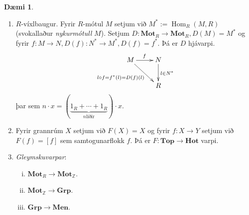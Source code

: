 \documentclass[a4paper,icelandic]{book}
\theoremstyle{definition}
\newtheorem{daemi}{Dæmi}[section]
\theoremstyle{plain}
\theoremstyle{remark}
\newcommand{\Z}{\mathbb{Z}} %
\DeclareMathOperator{\Hom}{Hom}
\begin{document}
\begin{daemi}
  \begin{enumerate}[(1)]
    \item  $R$-víxlbaugur. Fyrir $R$-mótul $M$ setjum við $M^* :=
      \Hom_R(M,R)$ (svokallaður \emph{nykurmótull}
      $M$). Setjum $D:\mathbf{Mot}_R\to\mathbf{Mot}_R, D(M) = M^*$ og
      fyrir $f:M\to N, D(f): N^*\to M^*, D(f) = f^*$. Þá er $D$
      hjávarpi.  
      \[ \xymatrix{ 
      M \ar[r]^f\ar[dr]_{l\circ f = f^*(l) = D(f)(l)}
      & N \ar[d]^{l\in N^*} \\ 
      & R
      }
      \] 
      þar sem $n \cdot x =
      (\underbrace{1_R+\cdots+1_R}_{n\text{liðir}})\cdot x$.
    \item Fyrir grannrúm $X$ setjum við $F(X) = X$ og fyrir $f:X\to Y$
      setjum við $F(f) = [f]$ sem samtogunarflokk $f$. Þá er
      $F:\mathbf{Top}\to\mathbf{Hot}$ varpi.
    \item \emph{Gleymskuvarpar}:
      \begin{enumerate}[(i)]
        \item $\mathbf{Mot}_R\to \mathbf{Mot}_\Z$.
        \item $\mathbf{Mot}_\Z\to \mathbf{Grp}$.
        \item $\mathbf{Grp}\to \mathbf{Men}$.
      \end{enumerate}
  \end{enumerate}
\end{daemi}
\end{document}
